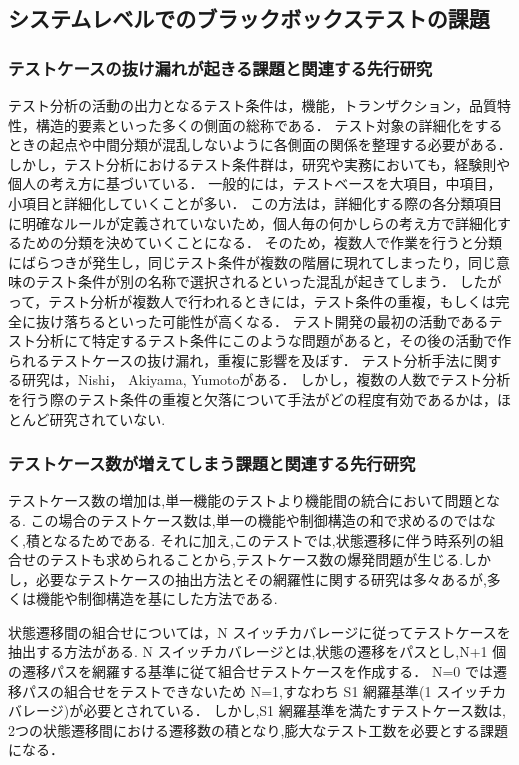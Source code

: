 \documentclass[10pt,a4j]{jarticle}
\begin{document}
\subsection{システムレベルでのブラックボックステストの課題} \label{sec:2-2}
\subsubsection{テストケースの抜け漏れが起きる課題と関連する先行研究}
テスト分析の活動の出力となるテスト条件は，機能，トランザクション，品質特性，構造的要素といった多くの側面の総称である．
テスト対象の詳細化をするときの起点や中間分類が混乱しないように各側面の関係を整理する必要がある．
しかし，テスト分析におけるテスト条件群は，研究や実務においても，経験則や個人の考え方に基づいている．
一般的には，テストベースを大項目，中項目，小項目と詳細化していくことが多い．
この方法は，詳細化する際の各分類項目に明確なルールが定義されていないため，個人毎の何かしらの考え方で詳細化するための分類を決めていくことになる．
そのため，複数人で作業を行うと分類にばらつきが発生し，同じテスト条件が複数の階層に現れてしまったり，同じ意味のテスト条件が別の名称で選択されるといった混乱が起きてしまう．
したがって，テスト分析が複数人で行われるときには，テスト条件の重複，もしくは完全に抜け落ちるといった可能性が高くなる．
テスト開発の最初の活動であるテスト分析にて特定するテスト条件にこのような問題があると，その後の活動で作られるテストケースの抜け漏れ，重複に影響を及ぼす．
テスト分析手法に関する研究は，Nishi\cite{nishi2012based}， Akiyama\cite{Akiyama2014}, Yumoto\cite{yumoto2013test}がある．
しかし，複数の人数でテスト分析を行う際のテスト条件の重複と欠落について手法がどの程度有効であるかは，ほとんど研究されていない.

\subsubsection{テストケース数が増えてしまう課題と関連する先行研究}
テストケース数の増加は,単一機能のテストより機能間の統合において問題となる.
この場合のテストケース数は,単一の機能や制御構造の和で求めるのではなく,積となるためである.
それに加え,このテストでは,状態遷移に伴う時系列の組合せのテストも求められることから,テストケース数の爆発問題が生じる.しかし，必要なテストケースの抽出方法とその網羅性に関する研究は多々あるが,多くは機能や制御構造を基にした方法である.\cite{myers2011art}

状態遷移間の組合せについては，N スイッチカバレージに従ってテストケースを抽出する方法がある. \cite{beiz90}
N スイッチカバレージとは,状態の遷移をパスとし,N+1 個の遷移パスを網羅する基準に従て組合せテストケースを作成する．
N=0 では遷移パスの組合せをテストできないため N=1,すなわち S1 網羅基準(1 スイッチカバレージ)が必要とされている．
しかし,S1 網羅基準を満たすテストケース数は, 2つの状態遷移間における遷移数の積となり,膨大なテスト工数を必要とする課題になる．
\end{document}
